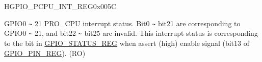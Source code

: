 \begin{register}{H}{GPIO\_PCPU\_INT\_REG}{0x005C}\label{regdesc:GPIOPCPUINTREG}
%
%
\regnewline%
\begin{regdesc}\begin{reglist}
\label{fielddesc:GPIOPROCPUINT}\item [GPIO\_PROCPU\_INT]

GPIO0 \verb+~+ 21 PRO\_CPU interrupt status. Bit0 \verb+~+ bit21 are corresponding to GPIO0 \verb+~+ 21, and bit22 \verb+~+ bit25 are invalid. This interrupt status is corresponding to the bit in \hyperref[regdesc:GPIOSTATUSREG]{GPIO\_STATUS\_REG} when assert (high) enable signal (bit13 of \hyperref[regdesc:GPIOPINNREG]{GPIO\_PIN\_REG}). (RO)
\end{reglist}\end{regdesc}
\end{register}




